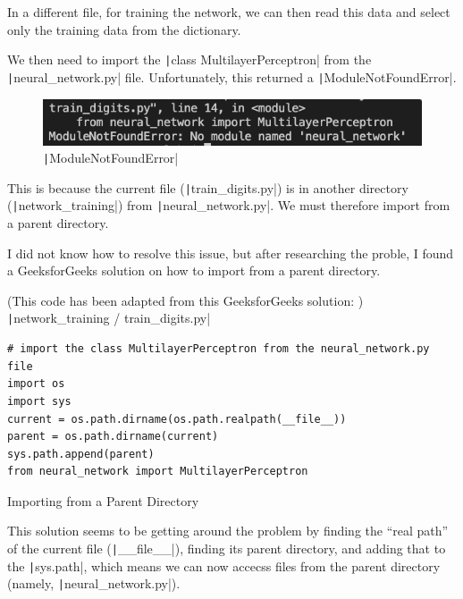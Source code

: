 \documentclass[12pt]{report}
\newcommand{\pil}[1]{\protect\texttt|#1|}
\begin{document}
In a different file, for training the network, we can then read this data and select only the training data from the dictionary.

We then need to import the \pil{class MultilayerPerceptron} from the \pil{neural_network.py} file. Unfortunately, this returned a \pil{ModuleNotFoundError}.

\begin{figure}[H]
\centering
\includegraphics[width=14cm]{ss9.1.png}
\caption{\pil{ModuleNotFoundError}}\label{fig:ss9.1}
\end{figure}

This is because the current file (\pil{train_digits.py}) is in another directory (\pil{network_training}) from \pil{neural_network.py}. We must therefore import from a parent directory.

I did not know how to resolve this issue, but after researching the proble, I found a GeeksforGeeks solution \cite{geeksforGeeksParentDir} on how to import from a parent directory.

\begin{listing}[H]
(This code has been adapted from this GeeksforGeeks solution: \cite{geeksforGeeksParentDir}) \\
\pil{network_training / train_digits.py}
\begin{verbatim}
# import the class MultilayerPerceptron from the neural_network.py file
import os
import sys
current = os.path.dirname(os.path.realpath(__file__))
parent = os.path.dirname(current)
sys.path.append(parent)
from neural_network import MultilayerPerceptron
\end{verbatim}
\caption{Importing from a Parent Directory}\label{cs:importParent}
\end{listing}

This solution seems to be getting around the problem by finding the ``real path'' of the current file (\pil{__file__}), finding its parent directory, and adding that to the \pil{sys.path}, which means we can now accecss files from the parent directory (namely, \pil{neural_network.py}).

\begin{center}
\end{center}
\end{document}
